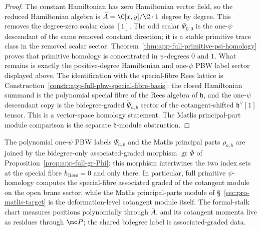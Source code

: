 \begin{proof}
  The constant Hamiltonian has zero Hamiltonian vector field, so the
  reduced Hamiltonian algebra is \(\bar A=\C[x,y]/\C\cdot1\) degree by
  degree.  This removes the degree-zero scalar class \([1]\).  The odd
  scalar \(\Psi_{0,0}\) is the one-\(\psi\) descendant of the same removed
  constant direction; it is a stable primitive trace class in the removed
  scalar sector.
  Theorem~\ref{thm:app-full-primitive-psi-homology} proves that
  primitive homology is concentrated in \(\psi\)-degrees \(0\) and \(1\).
  What remains
  is exactly the positive-degree Hamiltonian and one-\(\psi\) PBW label
  sector displayed above.  The identification with the special-fibre
  Rees lattice is
  Construction~\ref{constr:app-full-pbw-special-fibre-basis}: the closed
  Hamiltonian summand is the polynomial special fibre of the Rees algebra
  of \(\mathfrak h\), and the one-\(\psi\) descendant copy is the
  bidegree-graded \(\widetilde\Psi_{a,b}\) sector of the
  cotangent-shifted \(\mathfrak h^\vee[1]\) tensor.  This is a
  vector-space homology statement.  The Matlis principal-part module
  comparison is the separate \(\mathfrak h\)-module obstruction.
\end{proof}

\begin{cor}
\label{cor:app-full-defect-polarization-cocycle}
  The polynomial one-\(\psi\) PBW labels \(\Psi_{a,b}\) and the Matlis
  principal parts \(\rho_{a,b}\) are joined by the bidegree-only
  associated-graded morphism
  \(\operatorname{gr}\Phi\) of
  Proposition~\ref{prop:app-full-gr-Phi}: this morphism intertwines the
  two index sets at the special fibre \(\hbar_{\mathrm{Rees}}=0\) and only there.  In
  particular, full primitive \(\psi\)-homology computes the
  special-fibre associated graded of the cotangent module on the open
  brane sector, while the Matlis principal-parts module of
  \S~\ref{sec:pro-matlis-target} is the deformation-level
  cotangent module itself.  The formal-stalk chart measures positions
  polynomially through \(\bar A\), and its cotangent momenta live as
  residues through \(\mc P\); the shared bidegree label is
  associated-graded data.
\end{cor}

